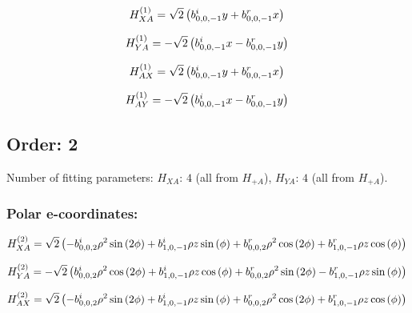 \documentclass[fleqn]{article}
\begin{document}
\begin{dmath*}
H_{XA}^{(1)}=\sqrt{2} \left(b^{i}_{0,0,-1} y + b^{r}_{0,0,-1} x\right)\\
\end{dmath*}

\begin{dmath*}
H_{YA}^{(1)}=-  \sqrt{2} \left( b^{i}_{0,0,-1} x -  b^{r}_{0,0,-1} y\right)\\
\end{dmath*}

\begin{dmath*}
H_{AX}^{(1)}=\sqrt{2} \left(b^{i}_{0,0,-1} y + b^{r}_{0,0,-1} x\right)\\
\end{dmath*}

\begin{dmath*}
H_{AY}^{(1)}=-  \sqrt{2} \left( b^{i}_{0,0,-1} x -  b^{r}_{0,0,-1} y\right)\\
\end{dmath*}
\subsection{Order: 2}
Number of fitting parameters: $H_{XA}$: $4$ (all from $H_{+A}$), $H_{YA}$: $4$ (all from $H_{+A}$).
\subsubsection*{Polar e-coordinates:}

\begin{dmath*}
H_{XA}^{(2)}=\sqrt{2} \left(- b^{i}_{0,0,2} \rho^{2} \sin{\left (2 \phi \right )} + b^{i}_{1,0,-1} \rho z \sin{\left (\phi \right )} + b^{r}_{0,0,2} \rho^{2} \cos{\left (2 \phi \right )} + b^{r}_{1,0,-1} \rho z \cos{\left (\phi \right )}\right)\\
\end{dmath*}

\begin{dmath*}
H_{YA}^{(2)}=-  \sqrt{2} \left( b^{i}_{0,0,2} \rho^{2} \cos{\left (2 \phi \right )} +  b^{i}_{1,0,-1} \rho z \cos{\left (\phi \right )} +  b^{r}_{0,0,2} \rho^{2} \sin{\left (2 \phi \right )} -  b^{r}_{1,0,-1} \rho z \sin{\left (\phi \right )}\right)\\
\end{dmath*}

\begin{dmath*}
H_{AX}^{(2)}=\sqrt{2} \left(- b^{i}_{0,0,2} \rho^{2} \sin{\left (2 \phi \right )} + b^{i}_{1,0,-1} \rho z \sin{\left (\phi \right )} + b^{r}_{0,0,2} \rho^{2} \cos{\left (2 \phi \right )} + b^{r}_{1,0,-1} \rho z \cos{\left (\phi \right )}\right)\\
\end{dmath*}
\end{document}
